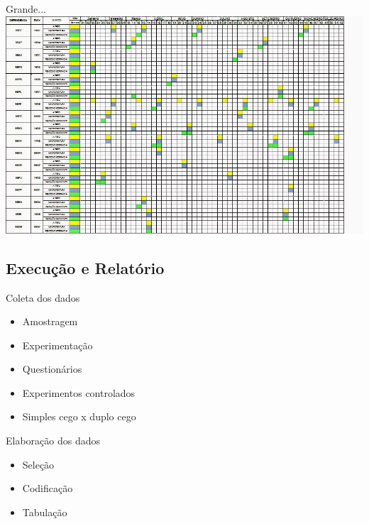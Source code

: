 \documentclass{beamer}
\begin{document}
\begin{frame}{Grande...}
  \includegraphics[width=\textwidth]{Etapas/cronograma-3}
\end{frame}



\subsection{Execução e Relatório}

\begin{frame}{Coleta dos dados}
  \begin{itemize}
  \item Amostragem
  \item Experimentação
  \item Questionários
  \item Experimentos controlados
  \item Simples cego x duplo cego
  \end{itemize}
\end{frame}

\begin{frame}{Elaboração dos dados}
  \begin{itemize}
  \item Seleção
  \item Codificação
  \item Tabulação
  \end{itemize}
\end{frame}
\end{document}

